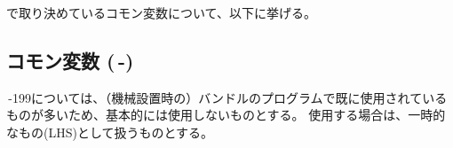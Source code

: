 
\DMname で取り決めているコモン変数について、以下に挙げる。






\subsection{コモン変数 (\,-)}
\,-\pcrNum199については、（機械設置時の）バンドルのプログラムで既に使用されているものが多いため、基本的には使用しないものとする。
使用する場合は、一時的なもの(LHS)として扱うものとする。




